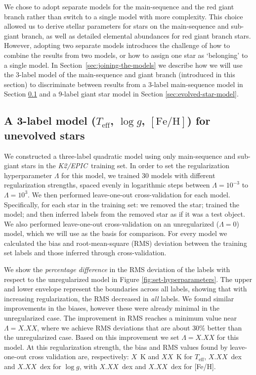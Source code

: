 \documentclass[preprint,trackchanges]{aastex}
\newcommand{\project}[1]{\textsl{#1}}
\newcommand{\epic}{\project{K2/EPIC}}
\newcommand{\teff}{T_{\mathrm{eff}}}
\newcommand{\logg}{\log g}
\newcommand{\feh}{[\mathrm{Fe/H}]}
\begin{document}
We chose to adopt separate models for the main-sequence and the red giant branch rather
than switch to a single model with more complexity.  This choice allowed us to derive
stellar parameters for stars on the main-sequence and sub-giant branch, as well as 
detailed elemental abundances for red giant branch stars.  However, adopting two separate
models introduces the challenge of how to combine the results from two models, or how to
assign one star as `belonging' to a single model.  In Section~\ref{sec:joining-the-models}
we describe how we will use the 3-label model of the main-sequence and giant branch
(introduced in this section) to discriminate between results from a 3-label 
main-sequence model in Section \ref{sec:unevolved-star-model} and a 9-label giant 
star model in Section \ref{sec:evolved-star-model}.


\subsection{A 3-label model ($\teff$, $\logg$, $\feh$) for unevolved stars}
\label{sec:unevolved-star-model}


We constructed a three-label quadratic model using only main-sequence and sub-giant
stars in the \epic\ training set.  In order to set the regularization hyperparameter
$\Lambda$ for this model, we trained 30 models with different regularization strengths,
spaced evenly in logarithmic steps between $\Lambda = 10^{-3}$ to $\Lambda = 10^{3}$.
We then performed leave-one-out cross-validation for each model.  Specifically, for 
each star in the training set: we removed the star; trained the model; and then 
inferred labels from the removed star as if it was a test object. We also performed 
leave-one-out cross-validation on an unregularized ($\Lambda = 0$) model, which we 
will use as the basis for comparison.  For every model we calculated the bias and
root-mean-square (RMS) deviation between the training set labels and those inferred
through cross-validation. 


We show the \emph{percentage difference} in the RMS deviation of the labels with respect
to the unregularized model in Figure \ref{fig:set-hyperparameters}.  The upper 
and lower envelope represent the boundaries across all labels, showing that with increasing
regularization, the RMS decreased in \emph{all} labels.  We found similar
improvements in the biases, however these were already minimal in the unregularized
case.  The improvement in RMS reaches a minimum value near $\Lambda = X.XX$, where
we achieve RMS deviations that are about 30\% better than the unregularized case.
Based on this improvement we set $\Lambda = X.XX$ for this model.  At this regularization 
strength, the bias and RMS values found by leave-one-out
cross validation are, respectively: $X$~K and $XX$~K for $\teff$, $X.XX$~dex and $X.XX$~dex
for $\logg$, with $X.XX$~dex and $X.XX$~dex for [Fe/H].
\end{document}
